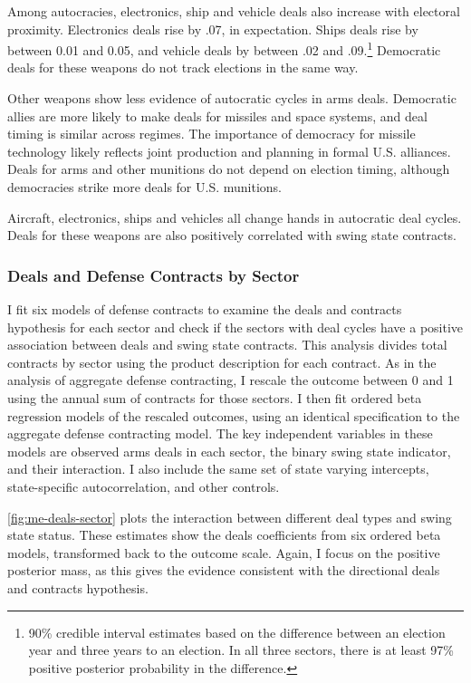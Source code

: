 \documentclass[12pt]{article}
\begin{document}
Among autocracies, electronics, ship and vehicle deals also increase with electoral proximity. 
Electronics deals rise by .07, in expectation.
Ships deals rise by between 0.01 and 0.05, and vehicle deals by between .02 and .09.\footnote{90\% credible interval estimates based on the difference between an election year and three years to an election. In all three sectors, there is at least 97\% positive posterior probability in the difference.}
Democratic deals for these weapons do not track elections in the same way.


Other weapons show less evidence of autocratic cycles in arms deals. 
Democratic allies are more likely to make deals for missiles and space systems, and deal timing is similar across regimes. 
The importance of democracy for missile technology likely reflects joint production and planning in formal U.S. alliances. 
Deals for arms and other munitions do not depend on election timing, although democracies strike more deals for U.S. munitions.  


Aircraft, electronics, ships and vehicles all change hands in autocratic deal cycles. 
Deals for these weapons are also positively correlated with swing state contracts.  

\subsubsection{Deals and Defense Contracts by Sector}


I fit six models of defense contracts to examine the deals and contracts hypothesis for each sector and check if the sectors with deal cycles have a positive association between deals and swing state contracts. 
This analysis divides total contracts by sector using the product description for each contract. 
As in the analysis of aggregate defense contracting, I rescale the outcome between 0 and 1 using the annual sum of contracts for those sectors. 
I then fit ordered beta regression models of the rescaled outcomes, using an identical specification to the aggregate defense contracting model.
The key independent variables in these models are observed arms deals in each sector, the binary swing state indicator, and their interaction. 
I also include the same set of state varying intercepts, state-specific autocorrelation, and other controls. 


\autoref{fig:me-deals-sector} plots the interaction between different deal types and swing state status.  
These estimates show the deals coefficients from six ordered beta models, transformed back to the outcome scale. 
Again, I focus on the positive posterior mass, as this gives the evidence consistent with the directional deals and contracts hypothesis.
\end{document}
